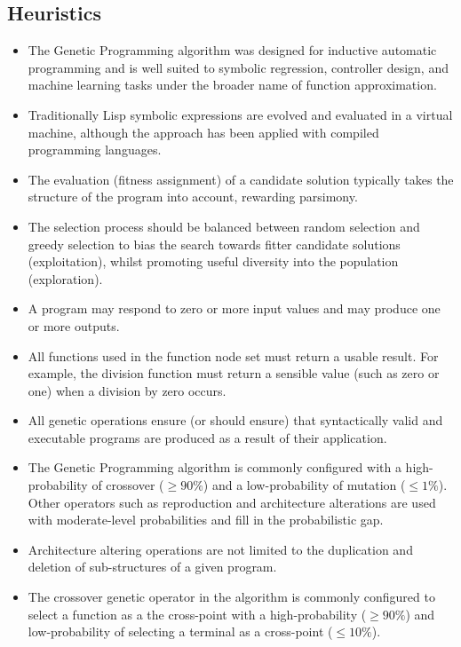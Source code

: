 \subsection{Heuristics}
\begin{itemize}
	\item The Genetic Programming algorithm was designed for inductive automatic programming and is well suited to symbolic regression, controller design, and machine learning tasks under the broader name of function approximation.
	\item Traditionally Lisp symbolic expressions are evolved and evaluated in a virtual machine, although the approach has been applied with compiled programming languages.
	\item The evaluation (fitness assignment) of a candidate solution typically takes the structure of the program into account, rewarding parsimony.
	\item The selection process should be balanced between random selection and greedy selection to bias the search towards fitter candidate solutions (exploitation), whilst promoting useful diversity into the population (exploration).
	\item A program may respond to zero or more input values and may produce one or more outputs.
	\item All functions used in the function node set must return a usable result. For example, the division function must return a sensible value (such as zero or one) when a division by zero occurs.
	\item All genetic operations ensure (or should ensure) that syntactically valid and executable programs are produced as a result of their application.
	\item The Genetic Programming algorithm is commonly configured with a high-probability of crossover ($\geq 90\%$) and a low-probability of mutation ($\leq 1\%$). Other operators such as reproduction and architecture alterations are used with moderate-level probabilities and fill in the probabilistic gap.
	\item Architecture altering operations are not limited to the duplication and deletion of sub-structures of a given program. 
	\item The crossover genetic operator in the algorithm is commonly configured to select a function as a the cross-point with a high-probability ($\geq 90\%$) and low-probability of selecting a terminal as a cross-point ($\leq 10\%$).

\end{itemize}
